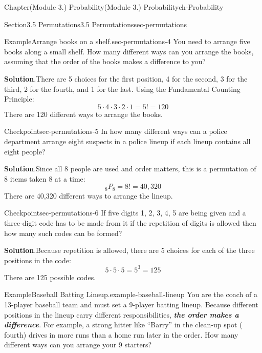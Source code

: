 \documentclass[oneside,10pt,]{book}
\newcommand{\blocktitlefont}{\relax}
\newcommand{\alert}[1]{\textbf{\textit{#1}}}
\begin{document}
\begin{chapterptx}{Chapter}{(Module 3.) Probability}{}{(Module 3.) Probability}{}{}{ch-Probability}
\begin{sectionptx}{Section}{3.5 Permutations}{}{3.5 Permutations}{}{}{sec-permutations}
\begin{example}{Example}{Arrange books on a shelf.}{sec-permutations-4}
You need to arrange five books along a small shelf. How many different ways can you arrange the books, assuming that the order of the books makes a difference to you?%
\par\smallskip%
\noindent\textbf{\blocktitlefont Solution}.\hypertarget{sec-permutations-4-3}{}\quad{}There are 5 choices for the first position, 4 for the second, 3 for the third, 2 for the fourth, and 1 for the last. Using the Fundamental Counting Principle:%
\begin{equation*}
5 \cdot 4 \cdot 3 \cdot 2 \cdot 1 = 5! = 120
\end{equation*}
There are 120 different ways to arrange the books.%
\end{example}
\begin{inlineexercise}{Checkpoint}{}{sec-permutations-5}%
In how many different ways can a police department arrange eight suspects in a police lineup if each lineup contains all eight people?%
\par\smallskip%
\noindent\textbf{\blocktitlefont Solution}.\hypertarget{sec-permutations-5-2}{}\quad{}Since all 8 people are used and order matters, this is a permutation of 8 items taken 8 at a time:%
\begin{equation*}
{}_8 P_8 = 8! = 40,320
\end{equation*}
There are 40,320 different ways to arrange the lineup.%
\end{inlineexercise}%
\begin{inlineexercise}{Checkpoint}{}{sec-permutations-6}%
If five digits 1, 2, 3, 4, 5 are being given and a three-digit code has to be made from it if the repetition of digits is allowed then how many such codes can be formed?%
\par\smallskip%
\noindent\textbf{\blocktitlefont Solution}.\hypertarget{sec-permutations-6-2}{}\quad{}Because repetition is allowed, there are 5 choices for each of the three positions in the code:%
\begin{equation*}
5 \cdot 5 \cdot 5 = 5^3 = 125
\end{equation*}
There are 125 possible codes.%
\end{inlineexercise}%
\begin{example}{Example}{Baseball Batting Lineup.}{example-baseball-lineup}%
You are the coach of a 13-player baseball team and must set a 9-player batting lineup. Because different positions in the lineup carry different responsibilities, \alert{the order makes a difference}. For example, a strong hitter like \textquotedblleft{}Barry\textquotedblright{} in the clean-up spot ( fourth) drives in more runs than a home run later in the order. How many different ways can you arrange your 9 starters?%

\end{example}
\end{sectionptx}
\end{chapterptx}
\end{document}
